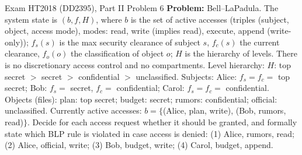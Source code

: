 \documentclass[12pt, a4paper]{article}
\begin{document}
\begin{practicebox}{Exam HT2018 (DD2395), Part II Problem 6}
\textbf{Problem:} Bell--LaPadula. The system state is $(b, f, H)$, where $b$ is the set of active accesses (triples (subject, object, access mode), modes: read, write (implies read), execute, append (write-only)); $f_s(s)$ is the max security clearance of subject $s$, $f_c(s)$ the current clearance, $f_o(o)$ the classification of object $o$; $H$ is the hierarchy of levels. There is no discretionary access control and no compartments. Level hierarchy: $H$: top secret $>$ secret $>$ confidential $>$ unclassified. Subjects: Alice: $f_s = f_c = $ top secret; Bob: $f_s = $ secret, $f_c = $ confidential; Carol: $f_s = f_c = $ confidential. Objects (files): plan: top secret; budget: secret; rumors: confidential; official: unclassified. Currently active accesses: $b = \{$(Alice, plan, write), (Bob, rumors, read)$\}$. Decide for each access request whether it should be granted, and formally state which BLP rule is violated in case access is denied: (1) Alice, rumors, read; (2) Alice, official, write; (3) Bob, budget, write; (4) Carol, budget, append.


\end{practicebox}
\end{document}
